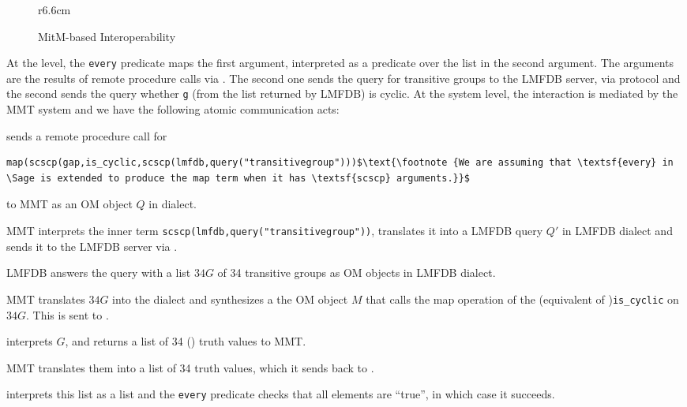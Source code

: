 \begin{wrapfigure}r{6.6cm}\vspace*{-2em}
  \vspace*{-1em}
  \caption{MitM-based Interoperability}\label{fig:mitmcomm}\vspace*{-1em}
\end{wrapfigure}
At the \Sage level, the \lstinline|every| predicate maps the first argument, interpreted as a predicate over the list in the second argument. 
The arguments are the results of remote procedure calls via \SCSCP. 
The second one sends the query for transitive groups to the LMFDB \SCSCP server, via \SCSCP protocol and the second sends the query whether \lstinline|g| (from the list returned by LMFDB) is cyclic.
At the system level, the interaction is mediated by the MMT system and we have the following atomic communication acts: 
\begin{compactenum}
\item \Sage sends a \SCSCP remote procedure call for 
  \begin{lstlisting}[mathescape]
    map(scscp(gap,is_cyclic,scscp(lmfdb,query("transitivegroup")))$\text{\footnote {We are assuming that \textsf{every} in \Sage is extended to produce the map term when it has \textsf{scscp} arguments.}}$
\end{lstlisting}
  to MMT as an OM object $Q$ in \Sage dialect.  
\item MMT interprets the inner term \lstinline|scscp(lmfdb,query("transitivegroup"))|, translates it into a LMFDB query $Q'$ in LMFDB dialect and sends it to the LMFDB \SCSCP server via \SCSCP. 
\item LMFDB answers the query with a list $34G$ of 34 transitive groups as OM objects in LMFDB dialect.
\item MMT translates $34G$ into the \GAP dialect and synthesizes a the OM object $M$ that calls the \GAP map operation of the (\GAP equivalent of )\lstinline|is_cyclic| on $34G$. This is sent to \GAP. 
\item \GAP interprets $G$, and returns a list of 34 (\GAP) truth values to MMT. 
\item MMT translates them into a list of 34 \Sage truth values, which it sends back to \Sage. 
\item \Sage interprets this list as a \Sage list and the \lstinline|every| predicate checks that all elements are ``true'', in which case it succeeds. 
\end{compactenum}

